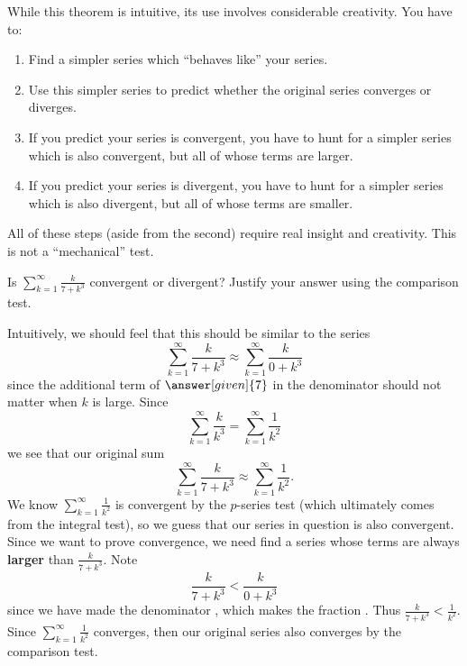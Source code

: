 \documentclass{ximera}
\begin{document}
While this theorem is intuitive, its use involves considerable
creativity.  You have to:
\begin{enumerate}
\item Find a simpler series which ``behaves like'' your series.
\item Use this simpler series to predict whether the original series
  converges or diverges.
\item If you predict your series is convergent, you have to hunt for a
  simpler series which is also convergent, but all of whose terms are
  larger.
\item If you predict your series is divergent, you have to hunt for a
  simpler series which is also divergent, but all of whose terms are
  smaller.
\end{enumerate}

All of these steps (aside from the second) require real insight and
creativity.  This is not a ``mechanical'' test.

\begin{example}
Is $\sum_{k=1}^\infty \frac{k}{7+k^3}$ convergent or divergent?
Justify your answer using the comparison test.
\begin{explanation}
  Intuitively, we should feel that this should be similar to the
  series
  \[
  \sum_{k=1}^\infty \frac{k}{7+ k^3} \approx \sum_{k=1}^\infty \frac{k}{0+k^3}
  \]
  since the additional term of $\answer[given]{7}$ in the denominator
  should not matter when $k$ is large. Since
  \[
  \sum_{k=1}^\infty \frac{k}{k^3} =\sum_{k=1}^\infty \frac{1}{k^2}
  \]
  we see that our original sum
  \[
  \sum_{k=1}^\infty \frac{k}{7+ k^3} \approx \sum_{k=1}^\infty \frac{1}{k^2}.
  \]
  We know $\sum_{k=1}^\infty \frac{1}{k^2}$ is convergent by the $p$-series
  test (which ultimately comes from the integral test), so we guess that our 
  series in question is also convergent.  Since we want
  to prove convergence, we need find a series whose terms are always
  \textbf{larger} than $\frac{k}{7+ k^3}$. Note
  \[
  \frac{k}{7+k^3} < \frac{k}{0+k^3}
  \]
  since we have made the denominator
  , which makes
  the fraction .
  Thus $\frac{k}{7+k^3} < \frac{1}{k^2}$.  Since $\sum_{k=1}^\infty
  \frac{1}{k^2}$ converges, then our original series also converges by
  the comparison test.
\end{explanation}
\end{example}
\end{document}
